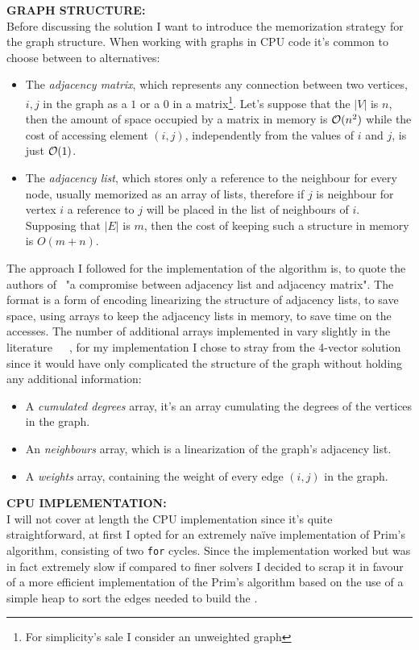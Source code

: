 \documentclass[a4paper,10pt]{article}
\begin{document}
\bigskip
{}
\makeatletter{}\makeatother\label{sec:graph-structure}
\noindent
\textbf{GRAPH STRUCTURE:}
\\
Before discussing the solution I want to introduce the memorization strategy for the graph structure. When working with graphs in CPU code it's common to choose between to alternatives:
\begin{itemize}
	\item The \emph{adjacency matrix}, which represents any connection between two vertices, $i, j$ in the graph as a $1$ or a $0$ in a matrix\footnote{For simplicity's sale I consider an unweighted graph}. Let's suppose that the $|V|$ is $n$, then the amount of space occupied by a matrix in memory is $\mathcal{O}(n^2)$ while the cost of accessing element $(i, j)$, independently from the values of $i$ and $j$, is just $\mathcal{O}(1)$.
	\item The \emph{adjacency list}, which stores only a reference to the neighbour for every node, usually memorized as an array of lists, therefore if $j$ is neighbour for vertex $i$ a reference to $j$ will be placed in the list of neighbours of $i$. Supposing that $|E|$ is $m$, then the cost of keeping such a structure in memory is $O(m + n)$.
\end{itemize}
The approach I followed for the implementation of the algorithm is, to quote the authors of~\cite{generic-he-boruvka} "a compromise between adjacency list and adjacency matrix". The \csr format is a form of encoding linearizing the structure of adjacency lists, to save space, using arrays to keep the adjacency lists in memory, to save time on the accesses. The number of additional arrays implemented in \csr vary slightly in the literature~\cite{csr-kelly}~\cite{csr-wheatman}~\cite{generic-he-boruvka}, for my implementation I chose to stray from the 4-vector solution since it would have only complicated the structure of the graph without holding any additional information:
\begin{itemize}
	\item A \emph{cumulated degrees} array, it's an array cumulating the degrees of the vertices in the graph.
	\item An \emph{neighbours} array, which is a linearization of the graph's adjacency list.
	\item A \emph{weights} array, containing the weight of every edge $(i, j)$ in the graph.
\end{itemize}

\bigskip
{}
\makeatletter\def\@currentlabel{\texttt{(III)}}\makeatother\label{sec:cpu-implementation}
\noindent
\textbf{CPU IMPLEMENTATION:}
\\
I will not cover at length the CPU implementation since it's quite straightforward, at first I opted
for an extremely na\"ive implementation of Prim's algorithm, consisting of two \texttt{for} cycles.
Since the implementation worked but was in fact extremely slow if compared to finer solvers I
decided to scrap it in favour of a more efficient implementation of the Prim's algorithm based on
the use of a simple heap to sort the edges needed to build the \mst.
\end{document}
